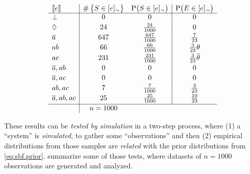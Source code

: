 \documentclass{article}
\newcommand{\at}[1]{\ensuremath{\!\del{#1}}}
\newcommand{\co}[1]{\ensuremath{\overline{#1}}}
\newcommand{\stablecore}[1]{\ensuremath{\left\llbracket #1 \right\rrbracket}}
\newcommand{\prfunc}{\ensuremath{\mathrm{P}}}
\newcommand{\pr}[1]{\ensuremath{\prfunc\at{#1}}}
\newcommand{\class}[1]{\ensuremath{[{#1}]_{\sim}}}
\newcommand{\inconsistent}{\bot}
\newcommand{\indepclass}{\ensuremath{\Diamond}}
\begin{document}
\begin{table}[t]
	\begin{center}
		$$
			\begin{array}{l|cc|c}
				\stablecore{e}
				 & \#\set{S \in \class{e}}
				 & \pr{S \in \class{e}}
				 & \pr{E \in \class{e}}
				\\
				\hline
				\inconsistent
				 & 0
				 & 0
				 & 0
				\\[2pt]
				\indepclass
				 & 24
				 & \frac{24}{1000}
				 & 0
				\\[2pt]
				\co{a}
				 & 647
				 & \frac{647}{1000}
				 & \frac{7}{23}
				\\[2pt]
				ab
				 & 66
				 & \frac{66}{1000}
				 & \frac{3}{23}\theta
				\\[2pt]
				ac
				 & 231
				 & \frac{231}{1000}
				 & \frac{3}{23}\co{\theta}
				\\[2pt]
				\co{a}, ab
				 & 0
				 & 0
				 & 0
				\\[2pt]
				\co{a}, ac
				 & 0
				 & 0
				 & 0
				\\[2pt]
				ab, ac
				 & 7
				 & \frac{7}{1000}
				 & \frac{3}{23}
				\\[2pt]
				\co{a}, ab, ac
				 & 25
				 & \frac{25}{1000}
				 & \frac{10}{23}
				\\[2pt]
				\hline
				 & n = 1000
			\end{array}
		$$
	\end{center}

	\caption{\emph{Experiment 1: bias to $ac$.} Results from an
	  experiment where $n=1000$ samples where generated following the
	  \emph{Model+Noise} procedure with parameters
	  $\alpha = 0.1, \beta = 0.3, \gamma = 0.2$.  The \emph{empirical}
	  distribution is represented by the random variable $S$ while the
	  \emph{prior}, as before, is denoted by
	  $E$.}\label{tab:sbf.example}
\end{table}

These results can be \emph{tested by simulation} in a two-step
process, where (1) a ``system'' is \emph{simulated}, to gather some
``observations'' and then (2) empirical distributions from those
samples are \emph{related} with the prior distributions from
\cref{eq:sbf.prior}.  
summarize some of those tests, where datasets of $n = 1000$
observations are generated and analyzed.
\end{document}
